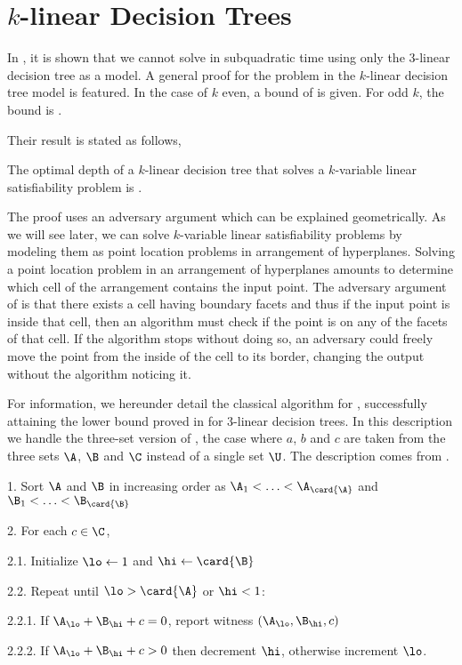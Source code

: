 \section{$k$-linear Decision Trees}

In \citet*{erickson:1999}, it is shown that we cannot solve \threeSUM in
subquadratic time using only the $3$-linear decision tree as a model. A general
proof for the \kLDT problem in the $k$-linear decision tree model is featured.
In the case of $k$ even, a bound of  is given. For
odd $k$, the bound is .

Their result is stated as follows,
\begin{theorem}
The optimal depth of a \(k\)-linear decision tree that solves
a \(k\)-variable linear satisfiability problem is .
\end{theorem}

The proof uses an adversary argument which can be explained geometrically. As
we will see later, we can solve \(k\)-variable linear satisfiability problems
by modeling them as point location problems in arrangement of hyperplanes.
Solving a point location problem in an arrangement of hyperplanes amounts to
determine which cell of the arrangement contains the input point. The adversary
argument of \citet*{erickson:1999} is that there exists a cell having
 boundary facets and thus if the input point is inside
that cell, then an algorithm must check if the point is on any of the facets of
that cell. If the algorithm stops without doing so, an adversary could freely
move the point from the inside of the cell to its border, changing the output
without the algorithm noticing it.

For information, we hereunder detail the classical  algorithm for
\threeSUM, successfully attaining the lower bound proved in
\cite{erickson:1999} for $3$-linear decision trees. In this description we
handle the three-set version of \threeSUM, \ie the case where $a$, $b$ and $c$
are taken from the three sets $\A$, $\B$ and $\C$ instead of a single set $\U$.
The description comes from \citet*{gronlund:2014}.


\begin{algorithm}
\item[1.] Sort $\A$ and $\B$ in increasing order as $\A_1 < \ldots <
\A_{\card{\A}}$ and $\B_1 < \ldots < \B_{\card{\B}}$
\item[2.] For each $c \in \C$,
\item[2.1.] Initialize $\lo \gets 1$ and $\hi \gets \card{\B}$
\item[2.2.] Repeat until $\lo > \card{\A}$ or $\hi < 1$:
\item[2.2.1.] If $\A_{\lo} + \B_{\hi} + c = 0$, report witness $(\A_{\lo},
\B_{\hi}, c)$
\item[2.2.2.] If $\A_{\lo} + \B_{\hi} + c > 0$ then decrement $\hi$, otherwise
increment $\lo$.
\end{algorithm}


